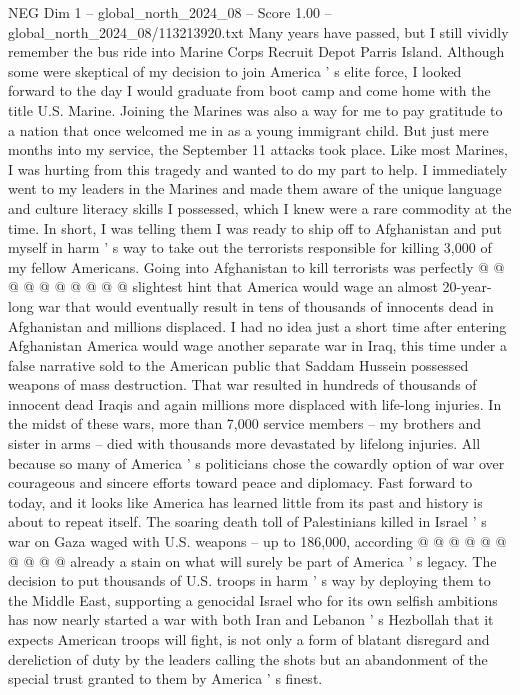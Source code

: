 \begin{textsample}{NEG Dim 1 – global\_north\_2024\_08 – Score 1.00 – global\_north\_2024\_08/113213920.txt}  \label{ex:f1_neg_384}
Many years have passed, but I still vividly remember the bus ride into Marine Corps Recruit Depot Parris Island.
Although some were skeptical of my decision to join America ' s elite force, I looked forward to the day I would graduate from boot camp and come home with the title U.S.
Marine.
Joining the Marines was also a way for me to pay gratitude to a nation that once welcomed me in as a young immigrant child.
But just mere months into my service, the September 11 attacks took place.
Like most Marines, I was hurting from this tragedy and wanted to do my part to help.
I immediately went to my leaders in the Marines and made them aware of the unique language and culture literacy skills I possessed, which I knew were a rare commodity at the time.
In short, I was telling them I was ready to ship off to Afghanistan and put myself in harm ' s way to take out the terrorists responsible for killing 3,000 of my fellow Americans.
Going into Afghanistan to kill terrorists was perfectly @ @ @ @ @ @ @ @ @ @ slightest hint that America would wage an almost 20-year-long war that would eventually result in tens of thousands of innocents dead in Afghanistan and millions displaced.
I had no idea just a short time after entering Afghanistan America would wage another separate war in Iraq, this time under a false narrative sold to the American public that Saddam Hussein possessed weapons of mass destruction.
That war resulted in hundreds of thousands of innocent dead Iraqis and again millions more displaced with life-long injuries.
In the midst of these wars, more than 7,000 service members -- my brothers and sister in arms -- died with thousands more devastated by lifelong injuries.
All because so many of America ' s politicians chose the cowardly option of war over courageous and sincere efforts toward peace and diplomacy.
Fast forward to today, and it looks like America has learned little from its past and history is about to repeat itself.
The soaring death toll of Palestinians killed in Israel ' s war on Gaza waged with U.S. weapons -- up to 186,000, according @ @ @ @ @ @ @ @ @ @ already a stain on what will surely be part of America ' s legacy.
The decision to put thousands of U.S. troops in harm ' s way by deploying them to the Middle East, supporting a genocidal Israel who for its own selfish ambitions has now nearly started a war with both Iran and Lebanon ' s Hezbollah that it expects American troops will fight, is not only a form of blatant disregard and dereliction of duty by the leaders calling the shots but an abandonment of the special trust granted to them by America ' s finest.

\end{textsample}
